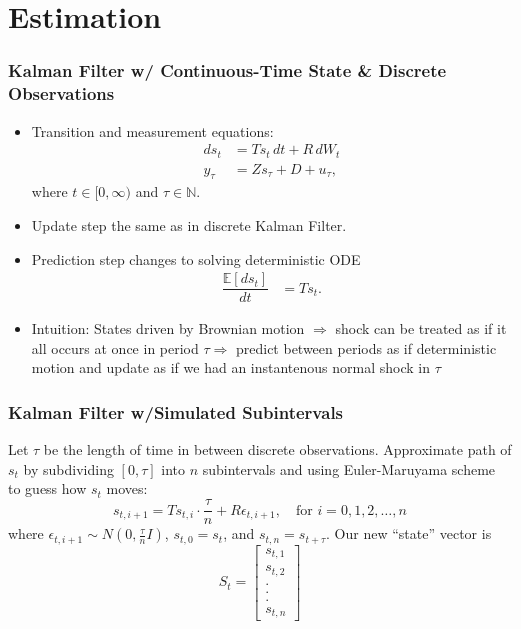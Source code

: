 \documentclass{beamer}
\newcommand{\E}{\mathbb{E}}
\newcommand{\N}{\mathbb{N}}
\newcommand{\RA}{\Rightarrow}
\begin{document}
\section{Estimation}

\begin{frame}
  \frametitle{Kalman Filter w/ Continuous-Time State \& Discrete Observations}
\begin{itemize}
\item Transition and measurement equations:
\begin{align*}
  ds_t & = Ts_t\,dt + R\, dW_t\\
  y_\tau & = Zs_\tau + D + u_\tau,
\end{align*}
where $t\in [0,\infty)$ and $\tau\in\N$.
\item Update step the same as in discrete Kalman Filter.
\item Prediction step changes to solving deterministic ODE
\begin{align*}
  \dfrac{\E[ds_t]}{dt} & = Ts_t.
\end{align*}
\item Intuition: States driven by Brownian motion $\RA$ shock can be treated as if it all occurs at once in period $\tau\RA$ predict between periods as if deterministic motion and update as if we had an instantenous normal shock in $\tau$
\end{itemize}
\end{frame}


\begin{frame}
  \frametitle{Kalman Filter w/Simulated Subintervals}
Let $\tau$ be the length of time in between discrete observations. Approximate path of $s_t$ by subdividing $[0,\tau]$ into $n$ subintervals and using Euler-Maruyama scheme to guess how $s_t$ moves:
\[s_{t,i+1} = Ts_{t, i}\cdot\dfrac{\tau}{n} + R\epsilon_{t,i+1},\quad\text{for }i =0,1,2,\dots, n  \]
where $\epsilon_{t,i+1}\sim N(0, \frac{\tau}{n}I)$, $s_{t,0} = s_{t}$, and $s_{t,n} = s_{t+\tau}$. Our new ``state'' vector is
\[S_t =
\begin{bmatrix}
  s_{t,1}\\s_{t,2}\\.\\.\\.\\s_{t,n}
\end{bmatrix}
\]
\end{frame}
\end{document}
